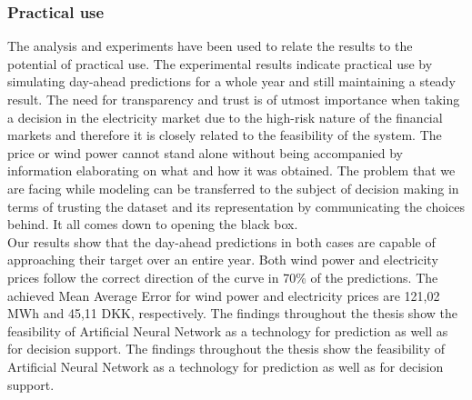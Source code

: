 \subsubsection{Practical use}
The analysis and experiments have been used to relate the results to the potential of practical use. The experimental results indicate practical use by simulating day-ahead predictions for a whole year and still maintaining a steady result. The need for transparency and trust is of utmost importance when taking a decision in the electricity market due to the high-risk nature of the financial markets and therefore it is closely related to the feasibility of the system. The price or wind power cannot stand alone without being accompanied by information elaborating on what and how it was obtained. The problem that we are facing while modeling can be transferred to the subject of decision making in terms of trusting the dataset and its representation by communicating the choices behind. It all comes down to opening the black box.
\\[1cm]
Our results show that the day-ahead predictions in both cases are capable of approaching their target over an entire year. Both wind power and electricity prices follow the correct direction of the curve in 70\% of the predictions. The achieved Mean Average Error for wind power and electricity prices are 121,02 MWh and 45,11 DKK, respectively. The findings throughout the thesis show the feasibility of Artificial Neural Network as a technology for prediction as well as for decision support. The findings throughout the thesis show the feasibility of Artificial Neural Network as a technology for prediction as well as for decision support.